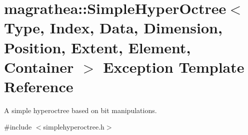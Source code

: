 \hypertarget{exceptionmagrathea_1_1SimpleHyperOctree}{\section{magrathea\-:\-:Simple\-Hyper\-Octree$<$ Type, Index, Data, Dimension, Position, Extent, Element, Container $>$ Exception Template Reference}
\label{exceptionmagrathea_1_1SimpleHyperOctree}
}


A simple hyperoctree based on bit manipulations.  




{\ttfamily \#include $<$simplehyperoctree.\-h$>$}

